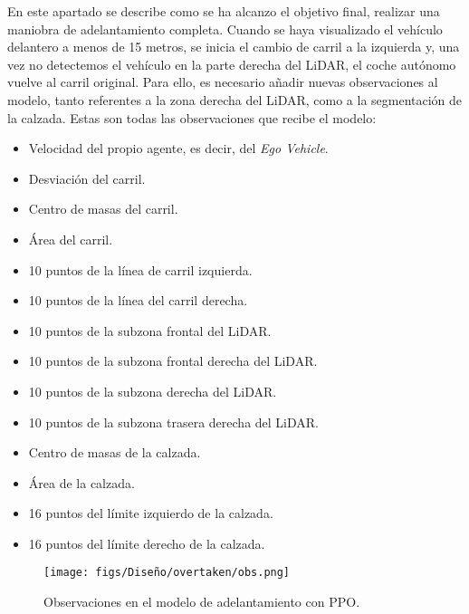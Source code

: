 En este apartado se describe como se ha alcanzo el objetivo final, realizar una maniobra de adelantamiento completa. Cuando se haya visualizado el vehículo delantero a menos de 15 metros, se inicia el cambio de carril a la izquierda y, una vez  no detectemos el vehículo en la parte derecha del \ac{LiDAR}, el coche autónomo vuelve al carril original. Para ello, es necesario añadir nuevas observaciones al modelo, tanto referentes a la zona derecha del \ac{LiDAR}, como a la segmentación de la calzada. Estas son todas las observaciones que recibe el modelo:
\begin{itemize}
\item Velocidad del propio agente, es decir, del \textit{Ego Vehicle}.
\item Desviación del carril.
\item Centro de masas del carril.
\item Área del carril.
\item 10 puntos de la línea de carril izquierda.
\item 10 puntos de la línea del carril derecha.
\item 10 puntos de la subzona frontal del \ac{LiDAR}.
\item 10 puntos de la subzona frontal derecha del \ac{LiDAR}.
\item 10 puntos de la subzona derecha del \ac{LiDAR}.
\item 10 puntos de la subzona trasera derecha del \ac{LiDAR}.
\item Centro de masas de la calzada.
\item Área de la calzada.
\item 16 puntos del límite izquierdo de la calzada.
\item 16 puntos del límite derecho de la calzada.
\end{itemize}

\begin{figure}[ht]
  \centering
  \texttt{[image: figs/Diseño/overtaken/obs.png]}
  \caption{Observaciones en el modelo de adelantamiento con \ac{PPO}.}
  \label{fig:obs_overtaken}
\end{figure}

